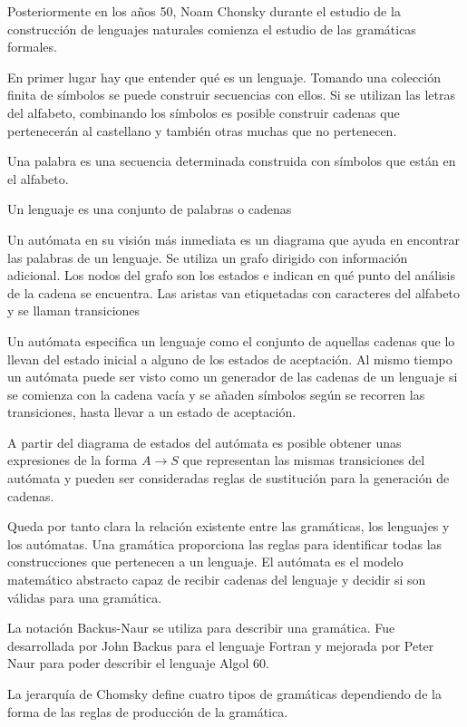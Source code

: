 Posteriormente en los años 50, Noam Chonsky durante el estudio de la construcción de lenguajes naturales comienza el estudio de las gramáticas formales.

En primer lugar hay que entender qué es un lenguaje. Tomando una colección finita de símbolos se puede construir secuencias con ellos. Si se utilizan las letras del alfabeto, combinando los símbolos es posible construir cadenas que pertenecerán al castellano y también otras muchas que no pertenecen.

Una palabra es una secuencia determinada construida con símbolos que están en el alfabeto.

Un lenguaje es una conjunto de palabras o cadenas

Un autómata en su visión más inmediata es un diagrama que ayuda en encontrar las palabras de un lenguaje. Se utiliza un grafo dirigido con información adicional. Los nodos del grafo son los estados e indican en qué punto del análisis de la cadena se encuentra. Las aristas van etiquetadas con caracteres del alfabeto y se llaman transiciones

Un autómata especifica un lenguaje como el conjunto de aquellas cadenas que lo llevan del estado inicial a alguno de los estados de aceptación. Al mismo tiempo un autómata puede ser visto como un generador de las cadenas de un lenguaje si se comienza con la cadena vacía y se añaden símbolos según se recorren las transiciones, hasta llevar a un estado de aceptación.

A partir del diagrama de estados del autómata es posible obtener unas expresiones de la forma $A\rightarrow S$ que representan las mismas transiciones del autómata y pueden ser consideradas reglas de sustitución para la generación de cadenas.

Queda por tanto clara la relación existente entre las gramáticas, los lenguajes y los autómatas. Una gramática proporciona las reglas para identificar todas las construcciones que pertenecen a un lenguaje. El autómata es el modelo matemático abstracto capaz de recibir cadenas del lenguaje y decidir si son válidas para una gramática.

La notación Backus-Naur se utiliza para describir una gramática. Fue desarrollada por John Backus para el lenguaje Fortran y mejorada por Peter Naur para poder describir el lenguaje Algol 60.

La jerarquía de Chomsky define cuatro tipos de gramáticas dependiendo de la forma de las reglas de producción de la gramática.

